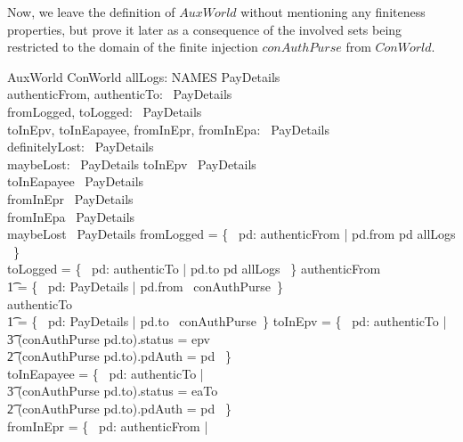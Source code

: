 Now, we leave the definition of $AuxWorld$ without mentioning
any finiteness properties, but prove it later as a consequence of
the involved sets being restricted to the domain of the finite injection $conAuthPurse$
from $ConWorld$.
%
\begin{LSDef}
\begin{schema}{AuxWorld}
   ConWorld
   \also
   allLogs: NAMES \rel PayDetails \\
   authenticFrom, authenticTo: \power~PayDetails \\
   fromLogged, toLogged: \power~PayDetails \\
   toInEpv, toInEapayee, fromInEpr, fromInEpa: \power~PayDetails \\
   definitelyLost: \power~PayDetails \\
   maybeLost: \power~PayDetails
\where
   toInEpv \in \finset~PayDetails \\
   toInEapayee \in \finset~PayDetails \\
   fromInEpr \in \finset~PayDetails \\
   fromInEpa \in \finset~PayDetails \\
   maybeLost \in \finset~PayDetails
   \also
   fromLogged = \{~ pd: authenticFrom | pd.from \mapsto pd \in allLogs ~\} \\
   toLogged = \{~ pd: authenticTo | pd.to \mapsto pd \in allLogs ~\}
   \also
   authenticFrom \\
      \t1 = \{~ pd: PayDetails | pd.from \in \dom~conAuthPurse~\} \\
   authenticTo \\
      \t1 = \{~ pd: PayDetails | pd.to \in \dom~conAuthPurse~\}
   \also
   toInEpv = \{~ pd: authenticTo | \\
          \t3 (conAuthPurse pd.to).status = epv \\
          \t2 \land (conAuthPurse pd.to).pdAuth = pd ~\} \\
   toInEapayee = \{~ pd: authenticTo | \\
          \t3 (conAuthPurse pd.to).status = eaTo \\
          \t2 \land (conAuthPurse pd.to).pdAuth = pd ~\} \\
   fromInEpr = \{~ pd: authenticFrom | \\

\end{schema}
\end{LSDef}
